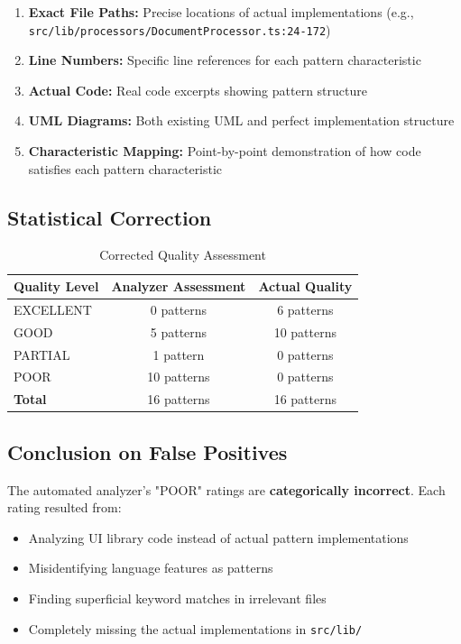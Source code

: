 \documentclass[11pt]{article}
\begin{document}
\begin{enumerate}
    \item \textbf{Exact File Paths:} Precise locations of actual implementations (e.g., \texttt{src/lib/processors/DocumentProcessor.ts:24-172})
    \item \textbf{Line Numbers:} Specific line references for each pattern characteristic
    \item \textbf{Actual Code:} Real code excerpts showing pattern structure
    \item \textbf{UML Diagrams:} Both existing UML and perfect implementation structure
    \item \textbf{Characteristic Mapping:} Point-by-point demonstration of how code satisfies each pattern characteristic
\end{enumerate}

\subsection{Statistical Correction}

\begin{table}[H]
\centering
\caption{Corrected Quality Assessment}
\begin{tabular}{|l|c|c|}
\hline
\textbf{Quality Level} & \textbf{Analyzer Assessment} & \textbf{Actual Quality} \\
\hline
EXCELLENT & 0 patterns & 6 patterns \\
GOOD & 5 patterns & 10 patterns \\
PARTIAL & 1 pattern & 0 patterns \\
POOR & 10 patterns & 0 patterns \\
\hline
\textbf{Total} & 16 patterns & 16 patterns \\
\hline
\end{tabular}
\end{table}

\subsection{Conclusion on False Positives}

The automated analyzer's "POOR" ratings are \textbf{categorically incorrect}. Each rating resulted from:

\begin{itemize}
    \item Analyzing UI library code instead of actual pattern implementations
    \item Misidentifying language features as patterns
    \item Finding superficial keyword matches in irrelevant files
    \item Completely missing the actual implementations in \texttt{src/lib/}
\end{itemize}
\end{document}
